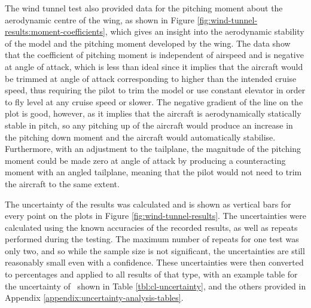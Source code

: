 \documentclass[../../main.tex]{subfiles}
\begin{document}
The wind tunnel test also provided data for the pitching moment about the aerodynamic centre of the wing, as shown in Figure \ref{fig:wind-tunnel-results:moment-coefficients}, which gives an insight into the aerodynamic stability of the model and the pitching moment developed by the wing.
The data show that the coefficient of pitching moment is independent of airspeed and is negative at  angle of attack, which is less than ideal since it implies that the aircraft would be trimmed at  angle of attack corresponding to higher than the intended cruise speed, thus requiring the pilot to trim the model or use constant elevator in order to fly level at any cruise speed or slower.
The negative gradient of the line on the plot is good, however, as it implies that the aircraft is aerodynamically statically stable in pitch, so any pitching up of the aircraft would produce an increase in the pitching down moment and the aircraft would automatically stabilise.
Furthermore, with an adjustment to the tailplane, the magnitude of the pitching moment could be made zero at  angle of attack by producing a counteracting moment with an angled tailplane, meaning that the pilot would not need to trim the aircraft to the same extent. 

The uncertainty of the results was calculated and is shown as vertical bars for every point on the plots in Figure \ref{fig:wind-tunnel-results}.
The uncertainties were calculated using the known accuracies of the recorded results, as well as repeats performed during the testing.
The maximum number of repeats for one test was only two, and so while the sample size is not significant, the uncertainties are still reasonably small even with a  confidence.
These uncertainties were then converted to percentages and applied to all results of that type, with an example table for the uncertainty of \cl\, shown in Table \ref{tbl:cl-uncertainty}, and the others provided in Appendix \ref{appendix:uncertainty-analysis-tables}.
\end{document}
